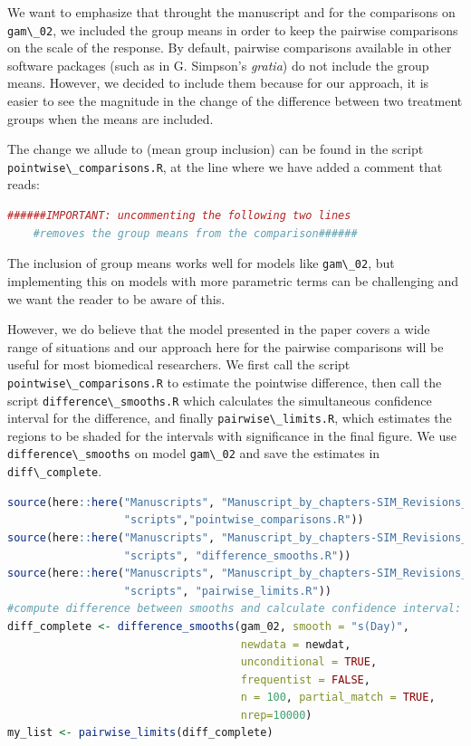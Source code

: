 \documentclass[
]{article}
\newcommand{\passthrough}[1]{#1}
\begin{document}
We want to emphasize that throught the manuscript and for the comparisons on \passthrough{\lstinline!gam\_02!}, we included the group means in order to keep the pairwise comparisons on the scale of the response. By default, pairwise comparisons available in other software packages (such as in G. Simpson's \emph{gratia}) do not include the group means. However, we decided to include them because for our approach, it is easier to see the magnitude in the change of the difference between two treatment groups when the means are included.

The change we allude to (mean group inclusion) can be found in the script \passthrough{\lstinline!pointwise\_comparisons.R!}, at the line where we have added a comment that reads:

\begin{lstlisting}[language=R]
######IMPORTANT: uncommenting the following two lines
    #removes the group means from the comparison######
\end{lstlisting}

The inclusion of group means works well for models like \passthrough{\lstinline!gam\_02!}, but implementing this on models with more parametric terms can be challenging and we want the reader to be aware of this.

However, we do believe that the model presented in the paper covers a wide range of situations and our approach here for the pairwise comparisons will be useful for most biomedical researchers. We first call the script \passthrough{\lstinline!pointwise\_comparisons.R!} to estimate the pointwise difference, then call the script \passthrough{\lstinline!difference\_smooths.R!} which calculates the simultaneous confidence interval for the difference, and finally \passthrough{\lstinline!pairwise\_limits.R!}, which estimates the regions to be shaded for the intervals with significance in the final figure. We use \passthrough{\lstinline!difference\_smooths!} on model \passthrough{\lstinline!gam\_02!} and save the estimates in \passthrough{\lstinline!diff\_complete!}.

\begin{lstlisting}[language=R]
source(here::here("Manuscripts", "Manuscript_by_chapters-SIM_Revisions_final", 
                  "scripts","pointwise_comparisons.R"))
source(here::here("Manuscripts", "Manuscript_by_chapters-SIM_Revisions_final",
                  "scripts", "difference_smooths.R"))
source(here::here("Manuscripts", "Manuscript_by_chapters-SIM_Revisions_final", 
                  "scripts", "pairwise_limits.R"))
#compute difference between smooths and calculate confidence interval: complete data
diff_complete <- difference_smooths(gam_02, smooth = "s(Day)", 
                                    newdata = newdat, 
                                    unconditional = TRUE,
                                    frequentist = FALSE,
                                    n = 100, partial_match = TRUE, 
                                    nrep=10000)
my_list <- pairwise_limits(diff_complete)
\end{lstlisting}
\end{document}
